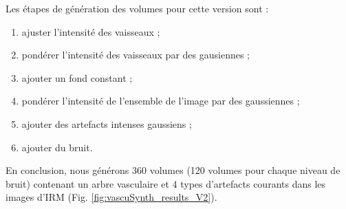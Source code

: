 Les étapes de génération des volumes pour cette version sont :

\begin{enumerate}
  \item ajuster l'intensité des vaisseaux ;
  \item pondérer l'intensité des vaisseaux par des gausiennes ;
  \item ajouter un fond constant ; 
  \item pondérer l'intensité de l'ensemble de l'image par des gaussiennes ;
  \item ajouter des artefacts intenses gaussiens ;
  \item ajouter du bruit.
  \end{enumerate}

En conclusion, nous générons 360 volumes (120 volumes pour chaque niveau de bruit) contenant un arbre vasculaire et 4 types d'artefacts courants dans les images d'IRM (Fig. \ref{fig:vascuSynth_results_V2}).

